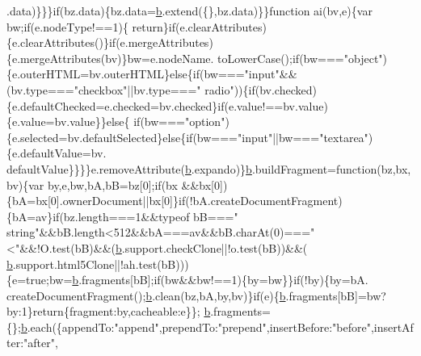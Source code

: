 \begin{DoxyCode}
      [by][bx].data)\}\}\}\textcolor{keywordflow}{if}(bz.data)\{bz.data=\hyperlink{jquery_8js_aa4026ad5544b958e54ce5e106fa1c805}{b}.extend(\{\},bz.data)\}\}\textcolor{keyword}{function} ai(bv,e)\{var bw;\textcolor{keywordflow}{if}(e.nodeType!==1)\{\textcolor{keywordflow}{
      return}\}\textcolor{keywordflow}{if}(e.clearAttributes)\{e.clearAttributes()\}\textcolor{keywordflow}{if}(e.mergeAttributes)\{e.mergeAttributes(bv)\}bw=e.nodeName.
      toLowerCase();\textcolor{keywordflow}{if}(bw===\textcolor{stringliteral}{"object"})\{e.outerHTML=bv.outerHTML\}\textcolor{keywordflow}{else}\{\textcolor{keywordflow}{if}(bw===\textcolor{stringliteral}{"input"}&&(bv.type===\textcolor{stringliteral}{"checkbox"}||bv.type===\textcolor{stringliteral}{"
      radio"}))\{\textcolor{keywordflow}{if}(bv.checked)\{e.defaultChecked=e.checked=bv.checked\}\textcolor{keywordflow}{if}(e.value!==bv.value)\{e.value=bv.value\}\}\textcolor{keywordflow}{else}\{\textcolor{keywordflow}{
      if}(bw===\textcolor{stringliteral}{"option"})\{e.selected=bv.defaultSelected\}\textcolor{keywordflow}{else}\{\textcolor{keywordflow}{if}(bw===\textcolor{stringliteral}{"input"}||bw===\textcolor{stringliteral}{"textarea"})\{e.defaultValue=bv.
      defaultValue\}\}\}\}e.removeAttribute(\hyperlink{jquery_8js_aa4026ad5544b958e54ce5e106fa1c805}{b}.expando)\}\hyperlink{jquery_8js_aa4026ad5544b958e54ce5e106fa1c805}{b}.buildFragment=\textcolor{keyword}{function}(bz,bx,bv)\{var by,e,bw,bA,bB=bz[0];\textcolor{keywordflow}{if}(bx
      &&bx[0])\{bA=bx[0].ownerDocument||bx[0]\}\textcolor{keywordflow}{if}(!bA.createDocumentFragment)\{bA=av\}\textcolor{keywordflow}{if}(bz.length===1&&typeof bB===\textcolor{stringliteral}{"
      string"}&&bB.length<512&&bA===av&&bB.charAt(0)===\textcolor{stringliteral}{"<"}&&!O.test(bB)&&(\hyperlink{jquery_8js_aa4026ad5544b958e54ce5e106fa1c805}{b}.support.checkClone||!o.test(bB))&&(
      \hyperlink{jquery_8js_aa4026ad5544b958e54ce5e106fa1c805}{b}.support.html5Clone||!ah.test(bB)))\{e=\textcolor{keyword}{true};bw=\hyperlink{jquery_8js_aa4026ad5544b958e54ce5e106fa1c805}{b}.fragments[bB];\textcolor{keywordflow}{if}(bw&&bw!==1)\{by=bw\}\}\textcolor{keywordflow}{if}(!by)\{by=bA.
      createDocumentFragment();\hyperlink{jquery_8js_aa4026ad5544b958e54ce5e106fa1c805}{b}.clean(bz,bA,by,bv)\}\textcolor{keywordflow}{if}(e)\{\hyperlink{jquery_8js_aa4026ad5544b958e54ce5e106fa1c805}{b}.fragments[bB]=bw?by:1\}\textcolor{keywordflow}{return}\{fragment:by,cacheable:e\}\};
      \hyperlink{jquery_8js_aa4026ad5544b958e54ce5e106fa1c805}{b}.fragments=\{\};\hyperlink{jquery_8js_aa4026ad5544b958e54ce5e106fa1c805}{b}.each(\{appendTo:\textcolor{stringliteral}{"append"},prependTo:\textcolor{stringliteral}{"prepend"},insertBefore:\textcolor{stringliteral}{"before"},insertAfter:\textcolor{stringliteral}{"after"},

\end{DoxyCode}
